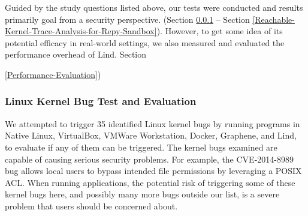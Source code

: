 Guided by the study questions listed above, our tests were conducted and results
primarily goal from a security perspective.
(Section \ref{Linux-Kernel-Bug-Test-and-Evaluation} --
Section \ref{Reachable-Kernel-Trace-Analysis-for-Repy-Sandbox}).
However, to get some idea of its potential efficacy
in real-world settings, we also measured and evaluated the performance
overhead of Lind.
Section {\ref{Performance-Evaluation})

\subsubsection{Linux Kernel Bug Test and Evaluation}
\label{Linux-Kernel-Bug-Test-and-Evaluation}

We attempted to trigger 35 identified Linux kernel bugs by running programs in
Native Linux, VirtualBox, VMWare Workstation, Docker, Graphene,
and Lind, to evaluate if any of them can be triggered.
The kernel bugs
examined are capable of causing serious security problems. For example,
the CVE-2014-8989 bug allows local users to bypass intended file
permissions by leveraging a POSIX ACL.
When running applications, the potential risk of triggering some of these
kernel bugs here,
and possibly many more bugs outside our list, is a severe problem that
users should be concerned about. 

}
